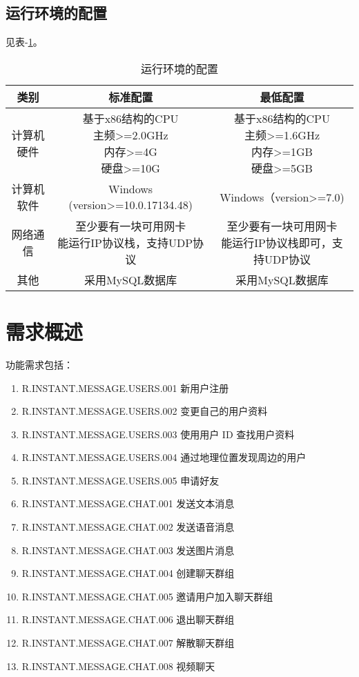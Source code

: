 \subsection{运行环境的配置}
见表-\ref{tab:operation-environment}。
\begin{table}[htbp]
\centering
\caption{运行环境的配置} \label{tab:operation-environment}
\begin{tabular}{|c|c|c|}
    \hline
    类别 & 标准配置 & 最低配置 \\
    \hline
    计算机硬件 & \tabincell{c}{基于x86结构的CPU\\ 主频>=2.0GHz\\ 内存>=4G\\ 硬盘>=10G} & \tabincell{c}{基于x86结构的CPU\\ 主频>=1.6GHz\\ 内存>=1GB\\ 硬盘>=5GB} \\
    \hline
    计算机软件 & \tabincell{c}{Windows (version>=10.0.17134.48)\\ } & \tabincell{c}{Windows（version>=7.0)\\    } \\
    \hline
    网络通信 & \tabincell{c}{至少要有一块可用网卡\\ 能运行IP协议栈，支持UDP协议} & \tabincell{c}{至少要有一块可用网卡\\ 能运行IP协议栈即可，支持UDP协议} \\
    \hline
    其他 & 采用MySQL数据库 & 采用MySQL数据库 \\
    \hline

\end{tabular}
\end{table}

\section{需求概述}
功能需求包括：
\begin{enumerate}
\item R.INSTANT.MESSAGE.USERS.001 新用户注册
\item R.INSTANT.MESSAGE.USERS.002 变更自己的用户资料
\item R.INSTANT.MESSAGE.USERS.003 使用用户 ID 查找用户资料
\item R.INSTANT.MESSAGE.USERS.004 通过地理位置发现周边的用户
\item R.INSTANT.MESSAGE.USERS.005 申请好友
\item R.INSTANT.MESSAGE.CHAT.001 发送文本消息
\item R.INSTANT.MESSAGE.CHAT.002 发送语音消息
\item R.INSTANT.MESSAGE.CHAT.003 发送图片消息
\item R.INSTANT.MESSAGE.CHAT.004 创建聊天群组
\item R.INSTANT.MESSAGE.CHAT.005 邀请用户加入聊天群组
\item R.INSTANT.MESSAGE.CHAT.006 退出聊天群组
\item R.INSTANT.MESSAGE.CHAT.007 解散聊天群组
\item R.INSTANT.MESSAGE.CHAT.008 视频聊天
\end{enumerate}


